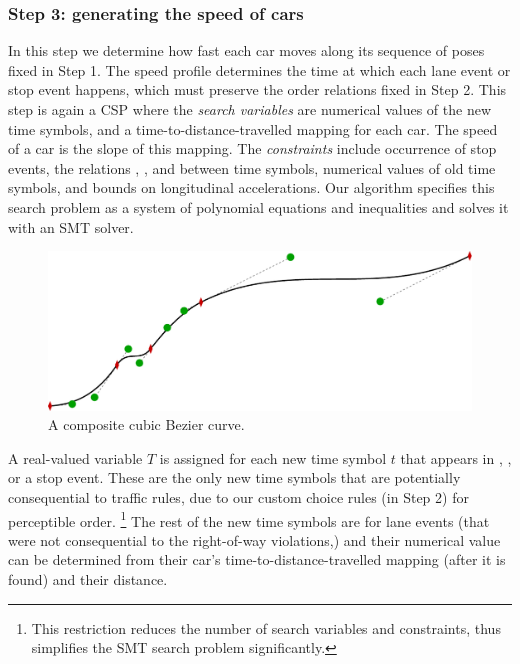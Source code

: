 \subsubsection{Step 3: generating the speed of cars}
In this step we determine how fast each car moves along its sequence of poses fixed in Step 1.
%
The speed profile determines the time at which each lane event or stop event happens, which must preserve the order relations fixed in Step 2.
%
This step is again a CSP where the \emph{search variables} are numerical values of the new time symbols, and a time-to-distance-travelled mapping for each car.
%
The speed of a car is the slope of this mapping.
%
The \emph{constraints} include occurrence of stop events, the relations , , and  between time symbols, numerical values of old time symbols, and bounds on longitudinal accelerations.
%
Our algorithm specifies this search problem as a system of polynomial equations and inequalities and solves it with an SMT solver.

\begin{figure}
\centering
\includegraphics[width=\linewidth]{figures/chapter4/composite-bezier.pdf}
\caption{A composite cubic Bezier curve.}
\label{fig:composite-Bezier}
\end{figure}


A real-valued variable $T$ is assigned for each new time symbol $t$ that appears in , , or a stop event.
%
These are the only new time symbols that are potentially consequential to traffic rules, due to our custom choice rules (in Step 2) for perceptible order.%
\footnote{This restriction reduces the number of search variables and constraints, thus simplifies the SMT search problem significantly.}
%
The rest of the new time symbols are for lane events (that were not consequential to the right-of-way violations,) and their numerical value can be determined from their car's time-to-distance-travelled mapping (after it is found) and their distance.


